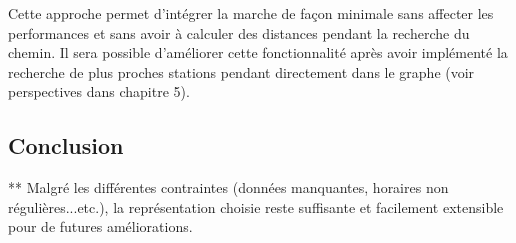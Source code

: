 Cette approche permet d'intégrer la marche de façon minimale sans affecter les performances et sans avoir à calculer des distances pendant la recherche du chemin.
Il sera possible d'améliorer cette fonctionnalité après avoir implémenté la recherche de plus proches stations pendant directement dans le graphe (voir perspectives dans chapitre 5).

\subsection{Conclusion}

** Malgré les différentes contraintes (données manquantes, horaires non régulières...etc.), la représentation choisie reste suffisante et facilement extensible pour de futures améliorations.
\newpage
